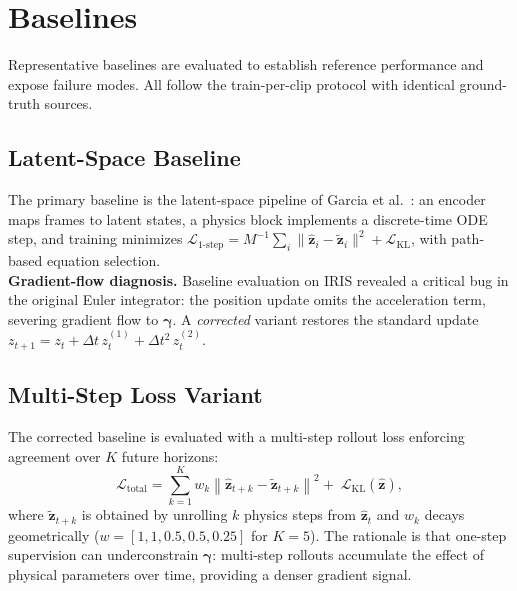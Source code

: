 \documentclass[runningheads]{llncs}
\begin{document}
\section{Baselines}
\label{sec:baselines}

Representative baselines are evaluated to establish reference performance and expose failure modes. All follow the train-per-clip protocol with identical ground-truth sources.

\subsection{Latent-Space Baseline}
\label{sec:baseline_latent}

The primary baseline is the latent-space pipeline of Garcia et al.~\cite{garcia2025learning}: an encoder maps frames to latent states, a physics block implements a discrete-time ODE step, and training minimizes $\mathcal{L}_{\mathrm{1\text{-}step}} = M^{-1}\sum_i \|\hat{\mathbf{z}}_i - \tilde{\mathbf{z}}_i\|^2 + \mathcal{L}_{\mathrm{KL}}$, with path-based equation selection.
\\
\noindent
\textbf{Gradient-flow diagnosis.} Baseline evaluation on IRIS revealed a critical bug in the original Euler integrator: the position update omits the acceleration term, severing gradient flow to $\boldsymbol{\gamma}$. A \emph{corrected} variant restores the standard update $z_{t+1} = z_t + \Delta t\, z_t^{(1)} + \Delta t^2\, z_t^{(2)}$.

\subsection{Multi-Step Loss Variant}
\label{sec:baseline_multistep}

The corrected baseline is evaluated with a multi-step rollout loss enforcing agreement over $K$ future horizons:
\begin{equation}
    \mathcal{L}_{\mathrm{total}} =
    \sum_{k=1}^{K} w_k \left\|
    \hat{\mathbf{z}}_{t+k} - \tilde{\mathbf{z}}_{t+k}
    \right\|^2
    +\; \mathcal{L}_{\mathrm{KL}}(\hat{\mathbf{z}}),
    \label{eq:loss_multistep}
\end{equation}
where $\tilde{\mathbf{z}}_{t+k}$ is obtained by unrolling $k$ physics steps from $\hat{\mathbf{z}}_t$ and $w_k$ decays geometrically ($w = [1, 1, 0.5, 0.5, 0.25]$ for $K{=}5$). The rationale is that one-step supervision can underconstrain $\boldsymbol{\gamma}$: multi-step rollouts accumulate the effect of physical parameters over time, providing a denser gradient signal.
\end{document}
